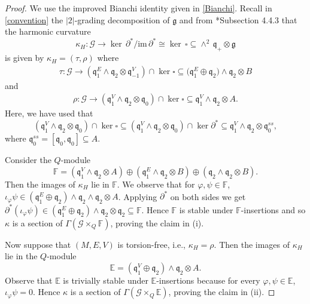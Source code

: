 \documentclass[11pt]{amsart}
\begin{document}
\begin{proof}
We use the improved Bianchi identity given in \cref{Bianchi}. Recall in \cref{convention} the $|2|$-grading decomposition of $\mathfrak g$ and from \cite{Book}*{Subsection 4.4.3} that the harmonic curvature 
\[\kappa_H:\mathcal G\to\ker\,\partial^*/\mathrm{im}\,\partial^*\cong\ker\,\square\subseteq\wedge^2\, \mathfrak q_+\otimes\mathfrak g\]
is given by $\kappa_H=(\tau,\rho)$ where
\begin{align*}
    \tau:\mathcal G\to(\mathfrak q_1^E\wedge\mathfrak q_2\otimes\mathfrak q_{-1}^V)\cap\ker\square\subseteq \mathfrak (\mathfrak q_1^E\oplus\mathfrak q_2)\wedge\mathfrak q_2\otimes B
\end{align*}
and
\begin{align*}
\rho:\mathcal G\to(\mathfrak q_1^V\wedge\mathfrak q_2\otimes\mathfrak q_{0})\cap\ker\square\subseteq \mathfrak q_1^V\wedge\mathfrak q_2\otimes A.
\end{align*}
Here, we have used that
\[(\mathfrak q_1^V\wedge\mathfrak q_2\otimes\mathfrak q_{0})\cap\ker\square\subseteq(\mathfrak q_1^V\wedge\mathfrak q_2\otimes\mathfrak q_{0})\cap\ker\partial^*\subseteq\mathfrak q_1^V\wedge\mathfrak q_2\otimes\mathfrak q^{ss}_{0},\]
where $\mathfrak q^{ss}_{0}=[\mathfrak q_0,\mathfrak q_0]\subseteq A$.

Consider the $Q$-module 
\[\mathbb F=(\mathfrak q_1^V\wedge\mathfrak q_2\otimes A)\oplus(\mathfrak q_1^E\wedge\mathfrak q_2\otimes B)
\oplus(\mathfrak q_2\wedge\mathfrak q_2\otimes B).\]
Then the images of $\kappa_H$ lie in $\mathbb F$. We observe that for $\varphi,\psi\in\mathbb F$, $\iota_\varphi\psi\in (\mathfrak q_1^E\oplus\mathfrak q_2)\wedge\mathfrak q_2\wedge\mathfrak q_2\otimes A$. Applying $\partial^*$ on both sides we get $\partial^*(\iota_\varphi\psi)\in(\mathfrak q_1^E\oplus\mathfrak q_2)\wedge\mathfrak q_2\otimes\mathfrak q_2\subseteq\mathbb F$. Hence $\mathbb F$ is stable under $\mathbb F$-insertions and so $\kappa$ is a section of $\Gamma(\mathcal G\times_Q\mathbb F)$, proving the claim in (i).

Now suppose that $(M,E,V)$ is torsion-free, i.e., $\kappa_H=\rho$. Then the images of $\kappa_H$ lie in the $Q$-module 
\[\mathbb E=(\mathfrak q_1^V\oplus\mathfrak q_2)\wedge\mathfrak q_2\otimes A.\] Observe that $\mathbb E$ is trivially stable under $\mathbb E$-insertions because for every $\varphi,\psi\in\mathbb E$, $\iota_\varphi\psi=0$. Hence $\kappa$ is a section of $\Gamma(\mathcal G\times_Q\mathbb E)$, proving the claim in (ii).
\end{proof}
\end{document}
